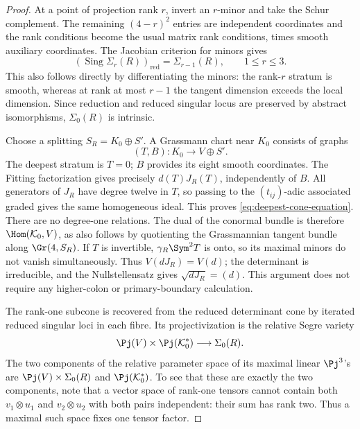 \begin{proof}
At a point of projection rank \(r\), invert an \(r\)-minor
and take the Schur complement.  The remaining \((4-r)^2\)
entries are independent coordinates and the rank conditions become
the usual matrix rank conditions, times smooth auxiliary coordinates.
The Jacobian criterion for minors gives
\[
 (\operatorname{Sing}\Sigma_r(R))_{\mathrm{red}}
       =\Sigma_{r-1}(R),\qquad 1\le r\le3.
\]
This also follows directly by differentiating the minors: the
rank-\(r\) stratum is smooth, whereas at rank at most \(r-1\)
the tangent dimension exceeds the local dimension.  Since reduction
and reduced singular locus are preserved by abstract isomorphisms,
\(\Sigma_0(R)\) is intrinsic.

Choose a splitting \(S_R=K_0\oplus S'\).  A Grassmann chart
near \(K_0\) consists of graphs
\[
 (T,B):K_0\longrightarrow V\oplus S'.
\]
The deepest stratum is \(T=0\); \(B\) provides its eight
smooth coordinates.  The Fitting factorization gives precisely
\(d(T)J_R(T)\), independently of \(B\).  All generators of
\(J_R\) have degree twelve in \(T\), so passing to the
\((t_{ij})\)-adic associated graded gives the same homogeneous
ideal.  This proves \eqref{eq:deepest-cone-equation}.  There are
no degree-one relations.  The dual of the conormal bundle is therefore
\(\Hom(\mathcal K_0,V)\), as also follows by quotienting the
Grassmannian tangent bundle along \(\Gr(4,S_R)\).  If \(T\) is invertible, \(\gamma_R\Sym^2T\) is onto,
so its maximal minors do not vanish simultaneously.  Thus
\(V(dJ_R)=V(d)\); the determinant is irreducible, and the
Nullstellensatz gives \(\sqrt{dJ_R}=(d)\).  This argument
does not require any higher-colon or primary-boundary calculation.

The rank-one subcone is recovered from the reduced determinant cone
by iterated reduced singular loci in each fibre.  Its projectivization
is the relative Segre variety
\[
 \Pj(V)\times\Pj(\mathcal K_0^*)
          \longrightarrow\Sigma_0(R).
\]
The two components of the relative parameter space of its maximal
linear \(\Pj^3\)'s are \(\Pj(V)\times\Sigma_0(R)\)
and \(\Pj(\mathcal K_0^*)\).  To see that these are exactly
the two components, note that a vector space of rank-one tensors
cannot contain both \(v_1\otimes u_1\) and
\(v_2\otimes u_2\) with both pairs independent: their sum has
rank two.  Thus a maximal such space fixes one tensor factor.


\end{proof}

